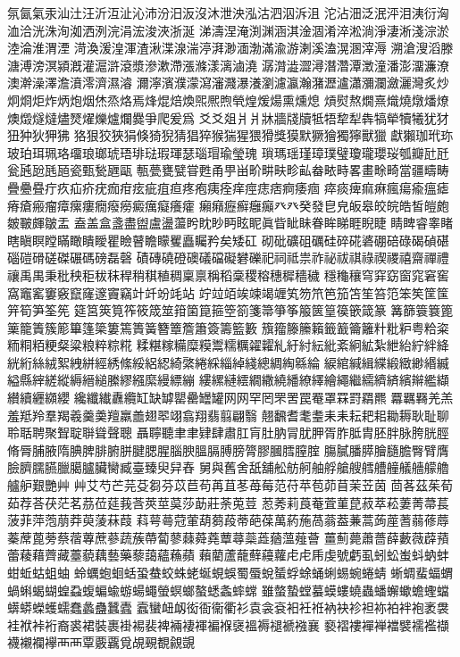 氛氤氣汞汕汢汪沂沍沚沁沛汾汨汳沒沐泄泱泓沽泗泅泝沮
沱沾沺泛泯泙泪洟衍洶洫洽洸洙洵洳洒洌浣涓浤浚浹浙涎
涕濤涅淹渕渊涵淇淦涸淆淬淞淌淨淒淅淺淙淤淕淪淮渭湮
渮渙湲湟渾渣湫渫湶湍渟湃渺湎渤滿渝游溂溪溘滉溷滓溽
溯滄溲滔滕溏溥滂溟潁漑灌滬滸滾漿滲漱滯漲滌漾漓滷澆
潺潸澁澀潯潛濳潭澂潼潘澎澑濂潦澳澣澡澤澹濆澪濟濕濬
濔濘濱濮濛瀉瀋濺瀑瀁瀏濾瀛瀚潴瀝瀘瀟瀰瀾瀲灑灣炙炒
炯烱炬炸炳炮烟烋烝烙焉烽焜焙煥煕熈煦煢煌煖煬熏燻熄
熕熨熬燗熹熾燒燉燔燎燠燬燧燵燼燹燿爍爐爛爨爭爬爰爲
⽘爻爼⽙爿牀牆牋牘牴牾犂犁犇犒犖犢犧犹犲狃狆狄狎狒
狢狠狡狹狷倏猗猊猜猖猝猴猯猩猥猾獎獏默獗獪獨獰獸獵
獻獺珈玳珎玻珀珥珮珞璢琅瑯琥珸琲琺瑕琿瑟瑙瑁瑜瑩瑰
瑣瑪瑶瑾璋璞璧瓊瓏瓔珱瓠瓣瓧瓩瓮瓲瓰瓱瓸瓷甄甃甅甌
甎甍甕甓甞甦甬甼畄畍畊畉畛畆畚畩畤畧畫畭畸當疆疇畴
疊疉疂疔疚疝疥疣痂疳痃疵疽疸疼疱痍痊痒痙痣痞痾痿痼
瘁痰痺痲痳瘋瘍瘉瘟瘧瘠瘡瘢瘤瘴瘰瘻癇癈癆癜癘癡癢癨
癩癪癧癬癰癲⽨癶癸發皀皃皈皋皎皖皓皙皚皰皴皸皹皺盂
盍盖盒盞盡盥盧盪蘯盻眈眇眄眩眤眞眥眦眛眷眸睇睚睨睫
睛睥睿睾睹瞎瞋瞑瞠瞞瞰瞶瞹瞿瞼瞽瞻矇矍矗矚矜矣矮矼
砌砒礦砠礪硅碎硴碆硼碚碌碣碵碪碯磑磆磋磔碾碼磅磊磬
磧磚磽磴礇礒礑礙礬礫祀祠祗祟祚祕祓祺祿禊禝禧齋禪禮
禳禹禺秉秕秧秬秡秣稈稍稘稙稠稟禀稱稻稾稷穃穗穉穡穢
穩龝穰穹穽窈窗窕窘窖窩竈窰窶竅竄窿邃竇竊竍竏竕竓站
竚竝竡竢竦竭竰笂笏笊笆笳笘笙笞笵笨笶筐筺笄筍笋筌筅
筵筥筴筧筰筱筬筮箝箘箟箍箜箚箋箒箏筝箙篋篁篌篏箴篆
篝篩簑簔篦篥籠簀簇簓篳篷簗簍篶簣簧簪簟簷簫簽籌籃籔
籏籀籐籘籟籤籖籥籬籵粃粐粤粭粢粫粡粨粳粲粱粮粹粽糀
糅糂糘糒糜糢鬻糯糲糴糶糺紆紂紜紕紊絅絋紮紲紿紵絆絳
絖絎絲絨絮絏絣經綉絛綏絽綛綺綮綣綵緇綽綫總綢綯緜綸
綟綰緘緝緤緞緻緲緡縅縊縣縡縒縱縟縉縋縢繆繦縻縵縹繃
縷縲縺繧繝繖繞繙繚繹繪繩繼繻纃緕繽辮繿纈纉續纒纐纓
纔纖纎纛纜缸缺罅罌罍罎罐⽹网罕罔罘罟罠罨罩罧罸羂羆
羃羈羇羌羔羞羝羚羣羯羲羹羮羶羸譱翅翆翊翕翔翡翦翩翳
翹飜耆耄耋⽾耒耘耙耜耡耨耿耻聊聆聒聘聚聟聢聨聳聲聰
聶聹聽⾀聿肄肆肅肛肓肚肭冐肬胛胥胙胝胄胚胖脉胯胱脛
脩脣脯腋隋腆脾腓腑胼腱腮腥腦腴膃膈膊膀膂膠膕膤膣腟
膓膩膰膵膾膸膽臀臂膺臉臍臑臙臘臈臚臟臠臧臺臻臾舁舂
舅與舊舍舐舖舩舫舸舳艀艙艘艝艚艟艤艢艨艪艫舮艱艷⾋
艸艾芍芒芫芟芻芬苡苣苟苒苴苳苺莓范苻苹苞茆苜茉苙茵
茴茖茲茱荀茹荐荅茯茫茗茘莅莚莪莟莢莖茣莎莇莊荼莵荳
荵莠莉莨菴萓菫菎菽萃菘萋菁菷萇菠菲萍萢萠莽萸蔆菻葭
萪萼蕚蒄葷葫蒭葮蒂葩葆萬葯葹萵蓊葢蒹蒿蒟蓙蓍蒻蓚蓐
蓁蓆蓖蒡蔡蓿蓴蔗蔘蔬蔟蔕蔔蓼蕀蕣蕘蕈蕁蘂蕋蕕薀薤薈
薑薊薨蕭薔薛藪薇薜蕷蕾薐藉薺藏薹藐藕藝藥藜藹蘊蘓蘋
藾藺蘆蘢蘚蘰蘿⾌虍乕虔號虧虱蚓蚣蚩蚪蚋蚌蚶蚯蛄蛆蚰
蛉蠣蚫蛔蛞蛩蛬蛟蛛蛯蜒蜆蜈蜀蜃蛻蜑蜉蜍蛹蜊蜴蜿蜷蜻
蜥蜩蜚蝠蝟蝸蝌蝎蝴蝗蝨蝮蝙蝓蝣蝪蠅螢螟螂螯蟋螽蟀蟐
雖螫蟄螳蟇蟆螻蟯蟲蟠蠏蠍蟾蟶蟷蠎蟒蠑蠖蠕蠢蠡蠱蠶蠹
蠧蠻衄衂衒衙衞衢衫袁衾袞衵衽袵衲袂袗袒袮袙袢袍袤袰
袿袱裃裄裔裘裙裝裹褂裼裴裨裲褄褌褊褓襃褞褥褪褫襁襄
褻褶褸襌褝襠襞襦襤襭襪襯襴襷⾑襾覃覈覊覓覘覡覩覦覬

